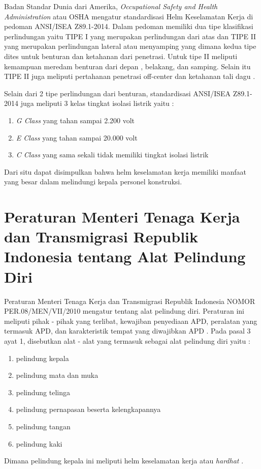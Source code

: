 Badan Standar Dunia dari Amerika, \emph{Occupational Safety and Health Administration} atau OSHA mengatur 
standardisasi Helm Keselamatan Kerja di pedoman ANSI/ISEA Z89.1-2014. Dalam pedoman memiliki dua tipe 
klasifikasi perlindungan yaitu TIPE I yang merupakan perlindungan dari atas dan TIPE II yang merupakan 
perlindungan lateral atau menyamping yang dimana kedua tipe dites untuk benturan dan ketahanan dari 
penetrasi. Untuk tipe II meliputi kemampuan meredam benturan dari depan , belakang, dan samping. 
Selain itu TIPE II juga meliputi pertahanan penetrasi off-center dan ketahanan tali dagu \cite{american1997american}.

Selain dari 2 tipe perlindungan dari benturan, standardisasi ANSI/ISEA Z89.1-2014 juga meliputi 3 kelas tingkat isolasi listrik yaitu \cite{american1997american}:
\begin{enumerate}
    \item \emph{G Class} yang tahan sampai 2.200 volt
    \item \emph{E Class} yang tahan sampai 20.000 volt
    \item \emph{C Class} yang sama sekali tidak memiliki tingkat isolasi listrik
\end{enumerate}

Dari situ dapat disimpulkan bahwa helm keselamatan kerja memiliki manfaat yang besar dalam melindungi kepala personel konstruksi.

\newpage

\section{Peraturan Menteri Tenaga Kerja dan Transmigrasi Republik Indonesia tentang Alat Pelindung Diri}
\label{sec:peraturanapd}

\par Peraturan Menteri Tenaga Kerja dan Transmigrasi Republik Indonesia NOMOR PER.08/MEN/VII/2010 mengatur tentang alat pelindung diri.
Peraturan ini meliputi pihak - pihak yang terlibat, kewajiban penyediaan APD, peralatan yang termasuk APD, dan karakteristik tempat
yang diwajibkan APD \cite{suratkementriantenagakerja}. Pada pasal 3 ayat 1, disebutkan alat - alat yang termasuk sebagai alat pelindung diri
yaitu :

\begin{enumerate}[nolistsep]
    \item pelindung kepala
    \item pelindung mata dan muka
    \item pelindung telinga
    \item pelindung pernapasan beserta kelengkapannya
    \item pelindung tangan
    \item pelindung kaki
\end{enumerate}
Dimana pelindung kepala ini meliputi helm keselamatan kerja atau \emph{hardhat} \cite{suratkementriantenagakerja}.

